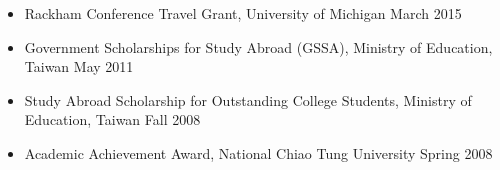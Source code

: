 \documentclass[10pt]{article}
\newenvironment{innerlist}[1][\enskip\textbullet]%
        {\begin{itemize}[#1,leftmargin=*,parsep=0pt,itemsep=0pt,topsep=0pt,partopsep=0pt]}
        {\end{itemize}}
\newcommand{\halfblankline}{\quad\vspace{-0.5\baselineskip}\pagebreak[3]}
\begin{document}
\begin{itemize}[leftmargin=0pt,parsep=3pt,itemsep=0pt,topsep=0pt,partopsep=0pt]
\item[] Rackham Conference Travel Grant, University of Michigan \hfill March 2015
\item[] Government Scholarships for Study Abroad (GSSA), Ministry of Education, Taiwan \hfill May 2011
\item[] Study Abroad Scholarship for Outstanding College Students, Ministry of Education, Taiwan \hfill Fall 2008
\item[] Academic Achievement Award, National Chiao Tung University \hfill Spring 2008
\end{itemize}
%
%
%
%
\end{document}

